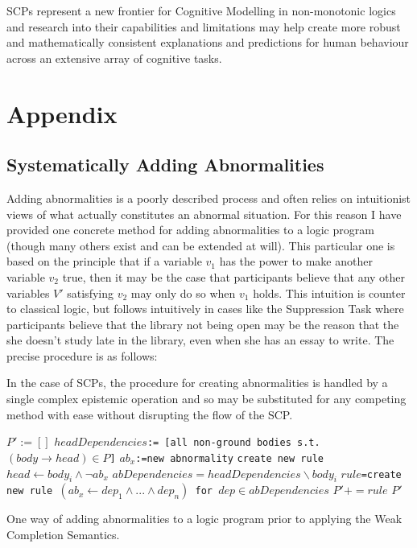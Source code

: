 \documentclass{article}
\begin{document}
SCPs represent a new frontier for Cognitive Modelling in non-monotonic logics and research into their capabilities and limitations may help create more robust and mathematically consistent explanations and predictions for human behaviour across an extensive array of cognitive tasks.


\newpage
	



\newpage
\section{Appendix}
\subsection{Systematically Adding Abnormalities} \label{ssec:addAbnormalities}
Adding abnormalities is a poorly described process and often relies on intuitionist views of what actually constitutes an abnormal situation. For this reason I have provided one concrete method for adding abnormalities to a logic program (though many others exist and can be extended at will). This particular one is based on the principle that if a variable $v_1$ has the power to make another variable $v_2$ true, then it may be the case that participants believe that any other variables $V'$ satisfying $v_2$ may only do so when $v_1$ holds. This intuition is counter to classical logic, but follows intuitively in cases like the Suppression Task where participants believe that the library not being open may be the reason that the she doesn't study late in the library, even when she has an essay to write. The precise procedure is as follows:


In the case of SCPs, the procedure for creating abnormalities is handled by a single complex epistemic operation and so may be substituted for any competing method with ease without disrupting the flow of the SCP.



\begin{algorithm}
\begin{algorithmic}[1]
\State \texttt{$P':=[]$}
\State \texttt{$headDependencies$:= [all non-ground bodies s.t.$(body \rightarrow head) \in P$]}
\State \texttt{$ab_{x}$:=new abnormality} 
\State \texttt{create new rule $head \leftarrow body_i \land \lnot ab_x$} 
\State \texttt {$abDependencies = headDependencies \backslash body_i$}
\State \texttt{$rule$=create new rule $(ab_x \leftarrow dep_1 \land ... \land dep_n)$ for $dep \in abDependencies$}
\State $P'+=rule$
\EndFor
\EndFor
\State \Return $P'$
\EndFunction
\end{algorithmic}
\caption{One way of adding abnormalities to a logic program prior to applying the Weak Completion Semantics.}
\label{alg:addAbnormalities}
\end{algorithm}
\end{document}
